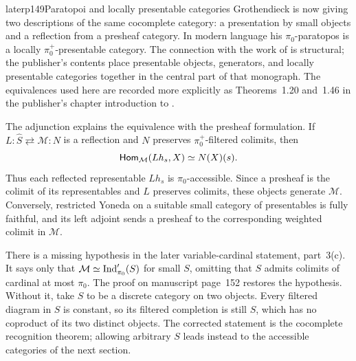 \begin{itemize}[leftmargin=2.5em]

\begin{dcomment}{later}{p149}{Paratopoi and locally presentable categories}
Grothendieck is now giving two descriptions of the same cocomplete category: a presentation by small objects and a reflection from a presheaf category. In modern language his $\pi_0$-paratopos is a locally $\pi_0^+$-presentable category. The connection with the work of \citet{GabrielUlmer1971} is structural; the publisher's contents place presentable objects, generators, and locally presentable categories together in the central part of that monograph. The equivalences used here are recorded more explicitly as Theorems~1.20 and~1.46 in the publisher's chapter introduction to \citet{AdamekRosicky1994}.

The adjunction explains the equivalence with the presheaf formulation. If
$L:\widehat S\rightleftarrows\mathcal M:N$ is a reflection and $N$ preserves $\pi_0^+$-filtered colimits, then
\[
 \mathsf{Hom}_{\mathcal M}(Lh_s,X)\simeq N(X)(s).
\]
Thus each reflected representable $Lh_s$ is $\pi_0$-accessible. Since a presheaf is the colimit of its representables and $L$ preserves colimits, these objects generate $\mathcal M$. Conversely, restricted Yoneda on a suitable small category of presentables is fully faithful, and its left adjoint sends a presheaf to the corresponding weighted colimit in $\mathcal M$.

There is a missing hypothesis in the later variable-cardinal statement, part~3(c). It says only that $\mathcal M\simeq\operatorname{Ind}'_{\pi_0}(S)$ for small $S$, omitting that $S$ admits colimits of cardinal at most $\pi_0$. The proof on manuscript page~152 restores the hypothesis. Without it, take $S$ to be a discrete category on two objects. Every filtered diagram in $S$ is constant, so its filtered completion is still $S$, which has no coproduct of its two distinct objects. The corrected statement is the cocomplete recognition theorem; allowing arbitrary $S$ leads instead to the accessible categories of the next section.
\end{dcomment}



\end{itemize}
